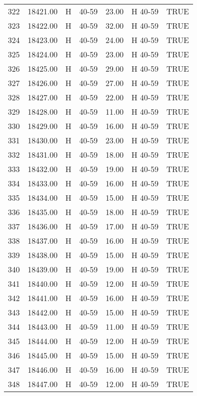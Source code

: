 \begin{table}[ht]
\begin{tabular}{rrllrll}
  322 & 18421.00 & H & 40-59 & 23.00 & H 40-59 & TRUE \\ 
  323 & 18422.00 & H & 40-59 & 32.00 & H 40-59 & TRUE \\ 
  324 & 18423.00 & H & 40-59 & 24.00 & H 40-59 & TRUE \\ 
  325 & 18424.00 & H & 40-59 & 23.00 & H 40-59 & TRUE \\ 
  326 & 18425.00 & H & 40-59 & 29.00 & H 40-59 & TRUE \\ 
  327 & 18426.00 & H & 40-59 & 27.00 & H 40-59 & TRUE \\ 
  328 & 18427.00 & H & 40-59 & 22.00 & H 40-59 & TRUE \\ 
  329 & 18428.00 & H & 40-59 & 11.00 & H 40-59 & TRUE \\ 
  330 & 18429.00 & H & 40-59 & 16.00 & H 40-59 & TRUE \\ 
  331 & 18430.00 & H & 40-59 & 23.00 & H 40-59 & TRUE \\ 
  332 & 18431.00 & H & 40-59 & 18.00 & H 40-59 & TRUE \\ 
  333 & 18432.00 & H & 40-59 & 19.00 & H 40-59 & TRUE \\ 
  334 & 18433.00 & H & 40-59 & 16.00 & H 40-59 & TRUE \\ 
  335 & 18434.00 & H & 40-59 & 15.00 & H 40-59 & TRUE \\ 
  336 & 18435.00 & H & 40-59 & 18.00 & H 40-59 & TRUE \\ 
  337 & 18436.00 & H & 40-59 & 17.00 & H 40-59 & TRUE \\ 
  338 & 18437.00 & H & 40-59 & 16.00 & H 40-59 & TRUE \\ 
  339 & 18438.00 & H & 40-59 & 15.00 & H 40-59 & TRUE \\ 
  340 & 18439.00 & H & 40-59 & 19.00 & H 40-59 & TRUE \\ 
  341 & 18440.00 & H & 40-59 & 12.00 & H 40-59 & TRUE \\ 
  342 & 18441.00 & H & 40-59 & 16.00 & H 40-59 & TRUE \\ 
  343 & 18442.00 & H & 40-59 & 15.00 & H 40-59 & TRUE \\ 
  344 & 18443.00 & H & 40-59 & 11.00 & H 40-59 & TRUE \\ 
  345 & 18444.00 & H & 40-59 & 12.00 & H 40-59 & TRUE \\ 
  346 & 18445.00 & H & 40-59 & 15.00 & H 40-59 & TRUE \\ 
  347 & 18446.00 & H & 40-59 & 16.00 & H 40-59 & TRUE \\ 
  348 & 18447.00 & H & 40-59 & 12.00 & H 40-59 & TRUE \\ 

\end{tabular}
\end{table}

